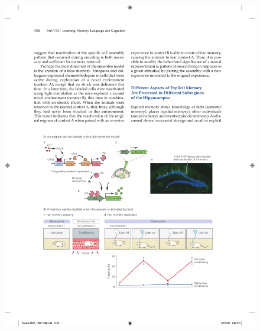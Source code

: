 \begin{figure}[htbp]
	\centering
	\includegraphics[width=0.9\linewidth]{chap54/fig_54_11}

\end{figure}
